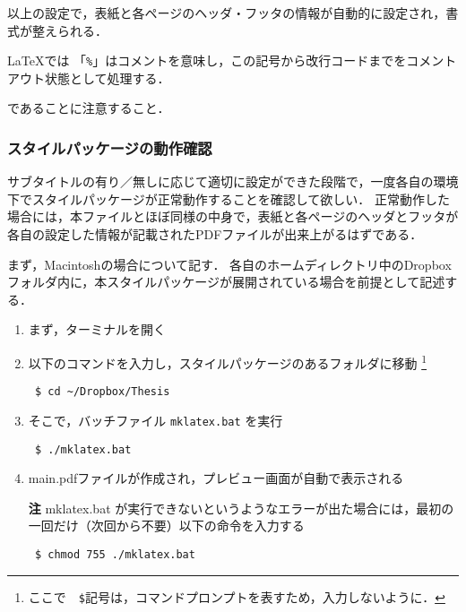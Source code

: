 以上の設定で，表紙と各ページのヘッダ・フッタの情報が自動的に設定され，書式が整えられる．
\begin{boxnote}
\LaTeX では 「\verb+%+」はコメントを意味し，この記号から改行コードまでをコメントアウト状態として処理する．
\end{boxnote}
であることに注意すること．

\subsubsection{スタイルパッケージの動作確認}
サブタイトルの有り／無しに応じて適切に設定ができた段階で，一度各自の環境下でスタイルパッケージが正常動作することを確認して欲しい．
正常動作した場合には，本ファイルとほぼ同様の中身で，表紙と各ページのヘッダとフッタが各自の設定した情報が記載されたPDFファイルが出来上がるはずである．

まず，Macintoshの場合について記す．
各自のホームディレクトリ中のDropboxフォルダ内に，本スタイルパッケージが展開されている場合を前提として記述する．
\begin{enumerate}
\item まず，ターミナルを開く
\item 以下のコマンドを入力し，スタイルパッケージのあるフォルダに移動
\footnote{ここで　\verb+$+記号は，コマンドプロンプトを表すため，入力しないように．}
\begin{screen}
{\small
\begin{verbatim}
 $ cd ~/Dropbox/Thesis
\end{verbatim}
}
\end{screen}

\item そこで，バッチファイル \verb+mklatex.bat+ を実行
\begin{screen}
{\small
\begin{verbatim}
 $ ./mklatex.bat
\end{verbatim}
}
\end{screen}

\item main.pdfファイルが作成され，プレビュー画面が自動で表示される
\item[\textbf{注}] mklatex.bat が実行できないというようなエラーが出た場合には，最初の一回だけ（次回から不要）以下の命令を入力する
\begin{screen}
{\small
\begin{verbatim}
 $ chmod 755 ./mklatex.bat
\end{verbatim}
}
\end{screen}
\end{enumerate}

